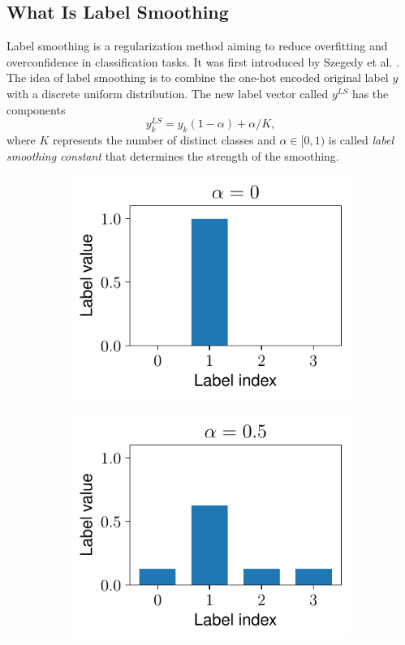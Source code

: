 \subsection{What Is Label Smoothing}
Label smoothing is a regularization method aiming to reduce overfitting and overconfidence in classification tasks. It was first introduced by Szegedy et al. \cite{szegedy2016}. The idea of label smoothing is to combine the one-hot encoded original label $y$ with a discrete uniform distribution. The  new label vector called $y^{LS}$ has the components 
$$y^{LS}_k=y_k(1-\alpha)+\alpha/K,$$ where $K$ represents the number of distinct classes and $\alpha\in\lbrack0,1)$ is called \textit{label smoothing constant} that determines the strength of the smoothing.
\begin{figure}[ht]
    \centering
    \begin{subfigure}{0.32\textwidth}
        \includegraphics[width=1\linewidth]{figures/ls_plot_0.pdf}
    \end{subfigure}
    \begin{subfigure}{0.32\textwidth}
        \includegraphics[width=1\linewidth]{figures/ls_plot_1.pdf}

\end{subfigure}
\end{figure}
